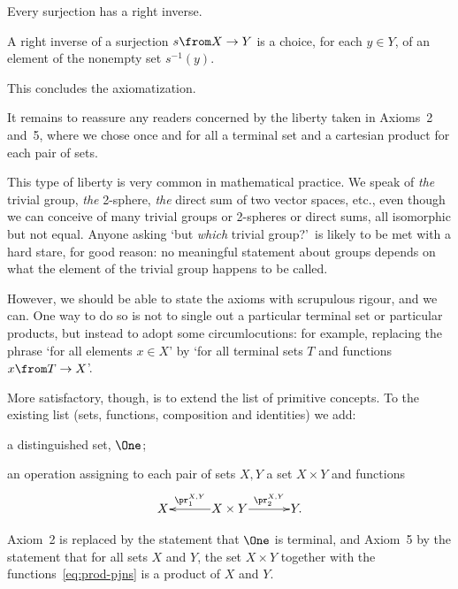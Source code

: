 \documentclass[12pt]{article}
\begin{document}
\begin{axiom}{10}
Every surjection has a right inverse.
\end{axiom}

A right inverse of a surjection $s\from X \to Y$ is a choice, for each $y \in
Y$, of an element of the nonempty set $s^{-1}(y)$.  

This concludes the axiomatization.


It remains to reassure any readers concerned by the liberty taken in
Axioms~2 and~5, where we chose once and for all a terminal set and a
cartesian product for each pair of sets.

This type of liberty is very common in mathematical practice.  We speak of
\emph{the} trivial group, \emph{the} 2-sphere, \emph{the} direct sum of two
vector spaces, etc., even though we can conceive of many trivial groups or
2-spheres or direct sums, all isomorphic but not equal.  Anyone asking `but
\emph{which} trivial group?'\ is likely to be met with a hard stare, for
good reason: no meaningful statement about groups depends on what the
element of the trivial group happens to be called.

However, we should be able to state the axioms with scrupulous rigour, and
we can.  One way to do so is not to single out a particular terminal set or
particular products, but instead to adopt some circumlocutions: for
example, replacing the phrase `for all elements $x \in X$' by `for all
terminal sets $T$ and functions $x\from T \to X$'.

More satisfactory, though, is to extend the list of primitive concepts.  To
the existing list (sets, functions, composition and identities) we add:
% 
\fmlon
\begin{myitemize}

\item a distinguished set, $\One$;

\item an operation assigning to each pair of sets $X, Y$ a set $X
\times Y$ and functions
% 
\begin{equation}
\label{eq:prod-pjns}
\xymatrix@1@C+2ex{
X       &
\ar[l]_-{\pr^{X, Y}_1} X \times Y \ar[r]^-{\pr^{X, Y}_2}  &
Y.
}
\end{equation}

\end{myitemize}
\fmloff
% 
Axiom~2 is replaced by the statement that $\One$ is terminal, and
Axiom~5 by the statement that for all sets $X$ and $Y$, the set $X \times
Y$ together with the functions~\eqref{eq:prod-pjns} is a product of $X$ and
$Y$.  
\end{document}
